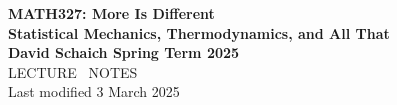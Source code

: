\documentclass[12 pt]{article} %
\begin{document}
\thispagestyle{empty}
\begin{center}
  {\LARGE \textbf{MATH327: More Is Different}} \\[6 pt]
  {\Large \textbf{Statistical Mechanics, Thermodynamics, and All That}} \\[6 pt]
  \textbf{David Schaich \qquad\qquad\qquad\qquad Spring Term 2025} \\[48 pt]
  {\LARGE LECTURE \ NOTES} \\[6 pt]
  Last modified 3 March 2025
\end{center}
\renewcommand{\contentsname}{}
\setcounter{tocdepth}{1}
\tableofcontents



\newpage


\newpage


\newpage


\newpage


\newpage


\newpage


\newpage


\newpage


\newpage


\newpage


\newpage




\end{document}
